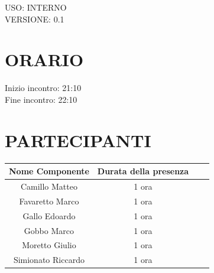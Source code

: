 \documentclass[5pt]{article}
\begin{document}
\begin{flushright}
    \begin{spacing}{1}
        USO: INTERNO\\
        VERSIONE: 0.1\\ %
    \end{spacing}
\end{flushright}


\restoregeometry

\pagebreak


\section{\Large ORARIO}
\begin{spacing}{1.5}
    {\large Inizio incontro: 21:10}\\
    {\large Fine incontro: 22:10}
\end{spacing}

\section{PARTECIPANTI}
\setlength\cellspacetoplimit{6pt}
\setlength\cellspacebottomlimit{6pt}

\begin{table}[ht]
  \begin{tabular}{|Sc|Sc|}
    \hline
    \textbf{Nome Componente} & \textbf{Durata della presenza} \\
    \hline
    Camillo Matteo & 1 ora \\
    Favaretto Marco & 1 ora \\
    Gallo Edoardo & 1 ora \\
    Gobbo Marco & 1 ora \\
    Moretto Giulio & 1 ora \\
    Simionato Riccardo & 1 ora \\
    \hline
  \end{tabular}
  \label{tab:conference}
\end{table}
\end{document}
